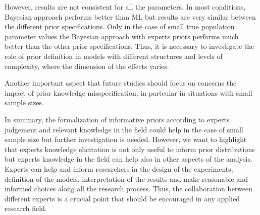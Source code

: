 \documentclass[graybox]{svmult}
\begin{document}
However, results are not consistent for all the parameters. In most conditions, Bayesian approach performs better than ML but results are very similar between the different prior specifications. Only in the case of small true population parameter values the Bayesian approach with experts priors performs much better than the other prior specifications. Thus, it is necessary to investigate the role of prior definition in models with different structures and levels of complexity, where the dimension of the effects varies.

Another important aspect that future studies should focus on concerns the impact of prior knowledge misspecification, in partcular in situations with small sample sizes.


In summary, the formalization of informative priors according to experts judgement and relevant knowledge in the field could help in the case of small sample size but further investigation is needed. However, we want to highlight that experts knowledge elicitation is not only useful to inform prior distributions but experts knowledge in the field can help also in other aspects of the analysis. Experts can help and inform researchers in the design of the experiments, definition of the models, interpretation of the results and make reasonable and informed choices along all the research process. Thus, the collaboration between different experts is a crucial point that should be encouraged in any applied research field.





%
\end{document}

